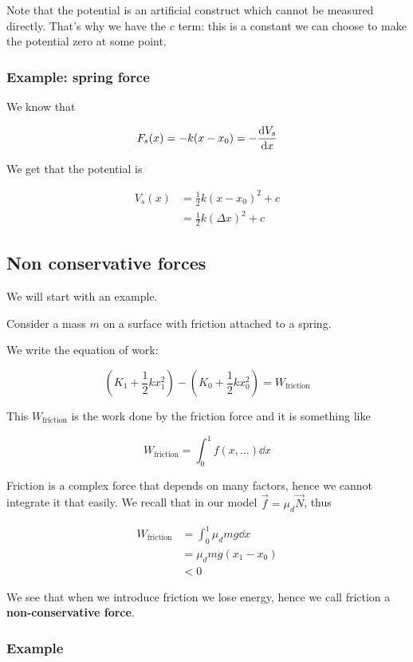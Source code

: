\documentclass[10pt]{extarticle}
\begin{document}
Note that the potential is an artificial construct which cannot be measured directly.
That's why we have the $c$ term: this is a constant we can choose to make the potential zero at some point.

\subsubsection{Example: spring force}

We know that

$$
    F_s(x) = -k (x - x_0) = - \dv{V_s}{x}(x)
$$

We get that the potential is

\begin{align*}
    V_s(x) & = \frac{1}{2} k (x - x_0)^2 + c  \\
           & = \frac{1}{2} k (\Delta x)^2 + c
\end{align*}

\subsection{Non conservative forces}

We will start with an example.

Consider a mass $m$ on a surface with friction attached to a spring.

We write the equation of work:

$$
    (K_1 + \frac{1}{2}kx_1^2) - (K_0 + \frac{1}{2}kx_0^2) = W_{\text{friction}}
$$

This $W_{\text{friction}}$ is the work done by the friction force and it is something like

$$
    W_{\text{friction}} = \int_0^1 f(x, \ldots) \dd{x}
$$

Friction is a complex force that depends on many factors, hence we cannot integrate it that easily. We recall that in our model $\vec f = \mu_d \vec N$, thus

\begin{align*}
    W_{\text{friction}} & = \int_0^1 \mu_d mg \dd{x} \\
                        & = \mu_d mg (x_1 - x_0)     \\
                        & < 0
\end{align*}

We see that when we introduce friction we lose energy, hence we call friction a \textbf{non-conservative force}.

\subsubsection{Example}
\end{document}
